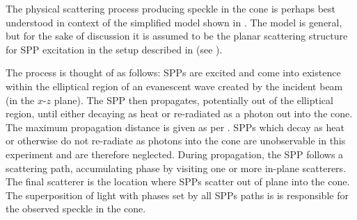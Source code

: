 The physical scattering process producing speckle in the cone is perhaps best
understood in context of the simplified model shown in
.  The model is general, but for the sake of
discussion it is assumed to be the planar scattering structure for SPP
excitation in the setup described in  (see
).  

The process is thought of as follows: SPPs are excited and come into existence
within the elliptical region of an evanescent wave created by the incident
beam (in the $x$-$z$ plane).  The SPP then propagates, potentially out of the
elliptical region, until either decaying as heat or re-radiated as a photon
out into the cone.  The maximum propagation distance is given as per
.  SPPs which decay as heat or otherwise do not
re-radiate as photons into the cone are unobservable in this experiment and
are therefore neglected.  During propagation, the SPP follows a scattering
path, accumulating phase by visiting one or more in-plane scatterers.  The
final scatterer is the location where SPPs scatter out of plane into the cone.
The superposition of light with phases set by all SPPs paths is is responsible
for the observed speckle in the cone.

